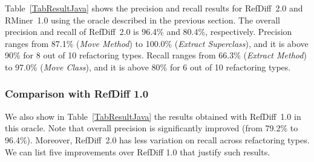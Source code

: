 \documentclass[10pt,journal,compsoc]{IEEEtran}
\begin{document}
Table~\ref{TabResultJava} shows the precision and recall results for RefDiff~2.0 and RMiner~1.0 using the oracle described in the previous section. The overall precision and recall of RefDiff~2.0 is 96.4\% and 80.4\%, respectively.
Precision ranges from 87.1\% (\emph{Move Method}) to 100.0\% (\emph{Extract Superclass}), and it is above 90\% for 8 out of 10 refactoring types.
Recall ranges from 66.3\% (\emph{Extract Method}) to 97.0\% (\emph{Move Class}), and it is above 80\% for 6 out of 10 refactoring types.

\subsubsection{Comparison with RefDiff 1.0}

We also show in Table~\ref{TabResultJava} the results obtained with RefDiff~1.0 in this oracle. Note that overall precision is significantly improved (from 79.2\% to 96.4\%). Moreover, RefDiff~2.0 has less variation on recall across refactoring types.
We can list five improvements over RefDiff 1.0 that justify such results.
\end{document}
